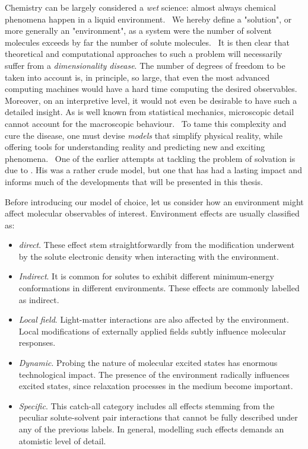 Chemistry can be largely considered a \emph{wet} science: almost always
chemical phenomena happen in a liquid environment.~\autocite{Reichardt2010-le}
We hereby define a "solution", or more generally an "environment", as
a system were the number of solvent molecules exceeds by far the number
of solute molecules.~\autocite{Tomasi2004-dc, Tomasi2007-es}
It is then clear that theoretical and computational approaches to such a
problem will necessarily suffer from a \emph{dimensionality disease}.
The number of degrees of freedom to be taken into account is, in
principle, so large, that even the most advanced computing machines
would have a hard time computing the desired observables.
Moreover, on an interpretive level, it would not even be desirable to
have such a detailed insight.
As is well known from statistical mechanics, microscopic detail cannot
account for the macroscopic behaviour.~\autocite{Hill1960-ql,
Hansen2013-io}
To tame this complexity and cure the disease, one must devise
\emph{models} that simplify physical reality, while offering tools for
understanding reality and predicting new and exciting
phenomena.~\autocite{Anderson1972-ai, Winsberg2010-sy, Kovac2011-ew}
One of the earlier attempts at tackling the problem of solvation is due
to \citeauthor{Onsager1936-wf}. His was a rather crude model, but one
that has had a lasting impact and informs much of the developments that
will be presented in this thesis.~\autocite{Onsager1936-wf}

Before introducing our model of choice, let us consider how an
environment might affect molecular observables of interest.
Environment effects are usually classified as:
\begin{itemize}
\item \emph{direct}.
  These effect stem straightforwardly from the modification underwent by
  the solute electronic density when interacting with the environment.
\item \emph{Indirect}.
  It is common for solutes to exhibit different minimum-energy
  conformations in different environments. These effects are commonly
  labelled as indirect.
\item \emph{Local field}.
  Light-matter interactions are also affected by the environment. Local
  modifications of externally applied fields subtly influence molecular
  responses.~\autocite{Cammi1998-jp, Pipolo2014-sd}
\item \emph{Dynamic}.
  Probing the nature of molecular excited states has enormous
  technological impact. The presence of the environment radically
  influences excited states, since relaxation processes in the medium
  become important.
\item \emph{Specific}. This catch-all category includes all effects
  stemming from the peculiar solute-solvent pair interactions that
  cannot be fully described under any of the previous labels.
  In general, modelling such effects demands an atomistic level of
  detail.
\end{itemize}

